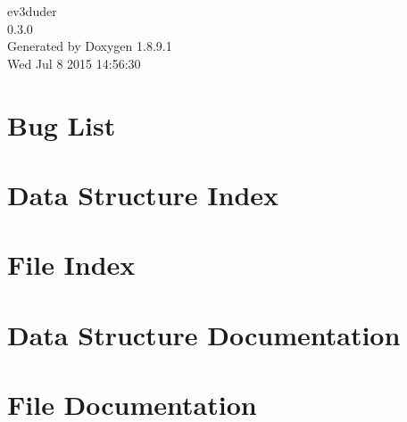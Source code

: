 \documentclass[twoside]{book}
\newcommand{\+}{\discretionary{\mbox{\scriptsize$\hookleftarrow$}}{}{}}
\newcommand{\clearemptydoublepage}{%
  \newpage{\pagestyle{empty}\cleardoublepage}%
}
\begin{document}
\hypersetup{pageanchor=false,
             bookmarks=true,
             bookmarksnumbered=true,
             pdfencoding=unicode
            }
\begin{titlepage}
\vspace*{7cm}
\begin{center}%
{\Large ev3duder \\[1ex]\large 0.\+3.\+0 }\\
\vspace*{1cm}
{\large Generated by Doxygen 1.8.9.1}\\
\vspace*{0.5cm}
{\small Wed Jul 8 2015 14:56:30}\\
\end{center}
\end{titlepage}
\clearemptydoublepage
\tableofcontents
\clearemptydoublepage
{}
\hypersetup{pageanchor=true}

\chapter{Bug List}
\label{bug}
\hypertarget{bug}{}

\chapter{Data Structure Index}

\chapter{File Index}

\chapter{Data Structure Documentation}


















\chapter{File Documentation}





















\backmatter
\newpage
{}
\clearemptydoublepage
{}
\printindex
\end{document}
